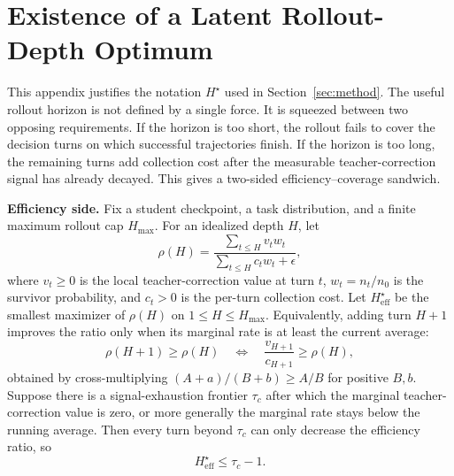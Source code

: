 \section{Existence of a Latent Rollout-Depth Optimum}
\label{app:rollout-depth-existence}

This appendix justifies the notation $H^\star$ used in
Section~\ref{sec:method}. The useful rollout horizon is not defined by a single
force. It is squeezed between two opposing requirements. If the horizon is too
short, the rollout fails to cover the decision turns on which successful
trajectories finish. If the horizon is too long, the remaining turns add
collection cost after the measurable teacher-correction signal has already
decayed. This gives a two-sided efficiency--coverage sandwich.

\textbf{Efficiency side.}
Fix a student checkpoint, a task distribution, and a finite maximum rollout cap
$H_{\max}$. For an idealized depth $H$, let
\begin{equation}
\rho(H)
  =
  \frac{\sum_{t\le H} v_t w_t}
       {\sum_{t\le H} c_t w_t+\epsilon},
\label{eq:app-efficiency-rate}
\end{equation}
where $v_t\ge0$ is the local teacher-correction value at turn $t$,
$w_t=n_t/n_0$ is the survivor probability, and $c_t>0$ is the per-turn
collection cost. Let $H_{\mathrm{eff}}^\star$ be the smallest maximizer of
$\rho(H)$ on $1\le H\le H_{\max}$. Equivalently, adding turn $H+1$ improves the
ratio only when its marginal rate is at least the current average:
\begin{equation}
\rho(H+1)\ge \rho(H)
\quad\Longleftrightarrow\quad
\frac{v_{H+1}}{c_{H+1}}\ge \rho(H),
\label{eq:app-marginal-rate}
\end{equation}
obtained by cross-multiplying
$(A+a)/(B+b)\ge A/B$ for positive $B,b$. Suppose there is a signal-exhaustion
frontier $\tau_c$ after which the marginal teacher-correction value is zero, or
more generally the marginal rate stays below the running average. Then every
turn beyond $\tau_c$ can only decrease the efficiency ratio, so
\begin{equation}
H_{\mathrm{eff}}^\star \le \tau_c-1 .
\label{eq:app-heff-upper}
\end{equation}

